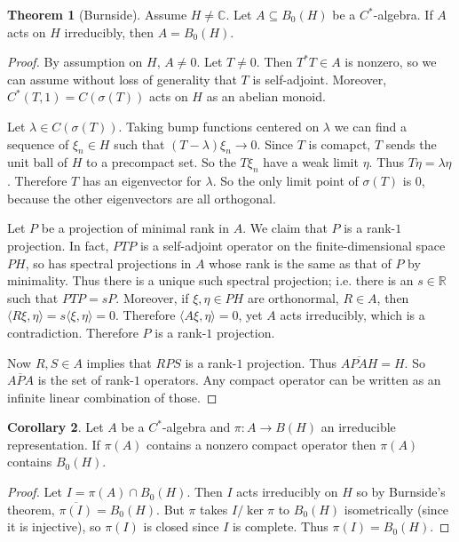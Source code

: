 \documentclass[12pt]{report}
\newcommand{\RR}{\mathbb{R}}
\newcommand{\CC}{\mathbb{C}}
\theoremstyle{definition}
\newtheorem{theorem}{Theorem}[chapter]
\newtheorem{corollary}[theorem]{Corollary}
\begin{document}
\begin{theorem}[Burnside]
    Assume $H \neq \CC$. Let $A \subseteq B_0(H)$ be a $C^*$-algebra. If $A$ acts on $H$ irreducibly, then $A = B_0(H)$.
\end{theorem}
\begin{proof}
    By assumption on $H$, $A \neq 0$. Let $T \neq 0$. Then $T^*T \in A$ is nonzero, so we can assume without loss of generality that $T$ is self-adjoint. Moreover, $C^*(T, 1) = C(\sigma(T))$ acts on $H$ as an abelian monoid.

    Let $\lambda \in C(\sigma(T))$. Taking bump functions centered on $\lambda$ we can find a sequence of $\xi_n \in H$ such that $(T - \lambda)\xi_n \to 0$. Since $T$ is comapct, $T$ sends the unit ball of $H$ to a precompact set. So the $T\xi_n$ have a weak limit $\eta$. Thus $T\eta = \lambda\eta$. Therefore $T$ has an eigenvector for $\lambda$. So the only limit point of $\sigma(T)$ is $0$, because the other eigenvectors are all orthogonal.

    Let $P$ be a projection of minimal rank in $A$. We claim that $P$ is a rank-$1$ projection. In fact, $PTP$ is a self-adjoint operator on the finite-dimensional space $PH$, so has spectral projections in $A$ whose rank is the same as that of $P$ by minimality. Thus there is a unique such spectral projection; i.e. there is an $s \in \RR$ such that $PTP = sP$. Moreover, if $\xi,\eta \in PH$ are orthonormal, $R \in A$, then $\langle R\xi, \eta\rangle = s\langle\xi, \eta\rangle = 0$. Therefore $\langle A\xi, \eta\rangle = 0$, yet $A$ acts irreducibly, which is a contradiction. Therefore $P$ is a rank-$1$ projection.

    Now $R,S \in A$ implies that $RPS$ is a rank-$1$ projection. Thus $\overline{APAH} = H$. So $\overline{APA}$ is the set of rank-$1$ operators. Any compact operator can be written as an infinite linear combination of those.
\end{proof}

\begin{corollary}
    Let $A$ be a $C^*$-algebra and $\pi: A \to B(H)$ an irreducible representation. If $\pi(A)$ contains a nonzero compact operator then $\pi(A)$ contains $B_0(H)$.
\end{corollary}
\begin{proof}
    Let $I = \pi(A) \cap B_0(H)$. Then $I$ acts irreducibly on $H$ so by Burnside's theorem, $\overline{\pi(I)} = B_0(H)$. But $\pi$ takes $I/\ker \pi$ to $B_0(H)$ isometrically (since it is injective), so $\pi(I)$ is closed since $I$ is complete. Thus $\pi(I) = B_0(H)$.
\end{proof}
\end{document}
